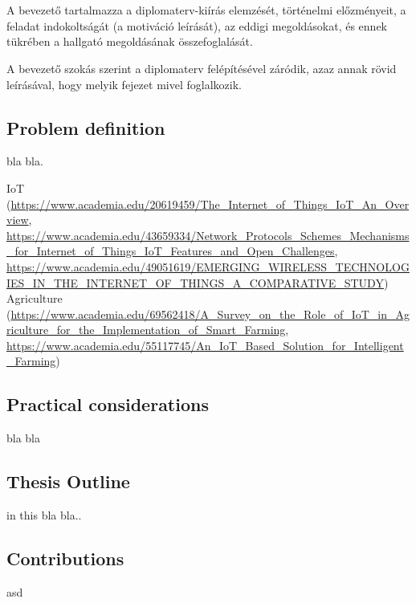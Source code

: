\chapter{\bevezetes}

A bevezető tartalmazza a diplomaterv-kiírás elemzését, történelmi előzményeit, a feladat indokoltságát (a motiváció leírását), az eddigi megoldásokat, és ennek tükrében a hallgató megoldásának összefoglalását.

A bevezető szokás szerint a diplomaterv felépítésével záródik, azaz annak rövid leírásával, hogy melyik fejezet mivel foglalkozik.

\section{Problem definition}

bla bla.

IoT (\url{https://www.academia.edu/20619459/The_Internet_of_Things_IoT_An_Overview}, \url{https://www.academia.edu/43659334/Network_Protocols_Schemes_Mechanisms_for_Internet_of_Things_IoT_Features_and_Open_Challenges}, \url{https://www.academia.edu/49051619/EMERGING_WIRELESS_TECHNOLOGIES_IN_THE_INTERNET_OF_THINGS_A_COMPARATIVE_STUDY})
Agriculture (\url{https://www.academia.edu/69562418/A_Survey_on_the_Role_of_IoT_in_Agriculture_for_the_Implementation_of_Smart_Farming}, \url{https://www.academia.edu/55117745/An_IoT_Based_Solution_for_Intelligent_Farming})


\section{Practical considerations}

bla bla

\section{Thesis Outline}

in this bla bla..

\section{Contributions}

asd